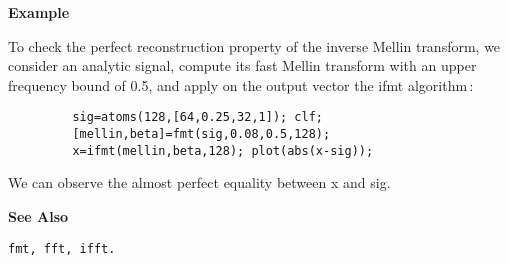 {\bf \large \sf Example}\\
\hspace*{1.5cm}
\begin{minipage}[t]{13.5cm}
To check the perfect reconstruction property of the inverse Mellin
transform, we consider an analytic signal, compute its fast Mellin
transform with an upper frequency bound of 0.5, and apply on the output
vector the {\ty ifmt} algorithm\,:
\begin{verbatim}
         sig=atoms(128,[64,0.25,32,1]); clf;
         [mellin,beta]=fmt(sig,0.08,0.5,128); 
         x=ifmt(mellin,beta,128); plot(abs(x-sig));
\end{verbatim}
We can observe the almost perfect equality between {\ty x} and {\ty sig}. 
\end{minipage}
\vspace*{.5cm}


{\bf \large \sf See Also}\\
\hspace*{1.5cm}
\begin{minipage}[t]{13.5cm}
\begin{verbatim}
fmt, fft, ifft.
\end{verbatim}
\end{minipage}
